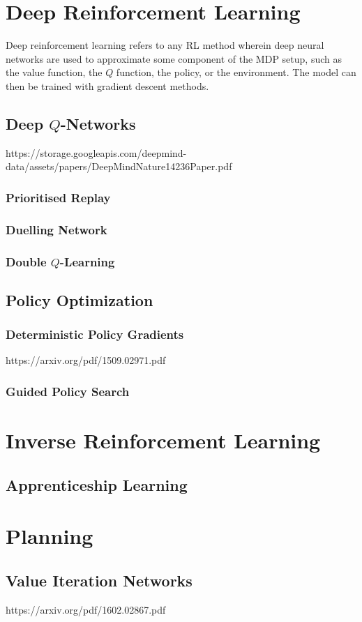 \documentclass{article}
\begin{document}
\section{Deep Reinforcement Learning}
Deep reinforcement learning refers to any RL method wherein deep neural networks are used to approximate some component of the MDP setup, such as the value function, the $ Q $ function, the policy, or the environment. The model can then be trained with gradient descent methods.

\subsection{Deep $ Q $-Networks}
https://storage.googleapis.com/deepmind-data/assets/papers/DeepMindNature14236Paper.pdf

\subsubsection{Prioritised Replay}

\subsubsection{Duelling Network}

\subsubsection{Double $ Q $-Learning}

\subsection{Policy Optimization}

\subsubsection{Deterministic Policy Gradients}
https://arxiv.org/pdf/1509.02971.pdf

\subsubsection{Guided Policy Search}

\section{Inverse Reinforcement Learning}

\subsection{Apprenticeship Learning}

\section{Planning}

\subsection{Value Iteration Networks}
https://arxiv.org/pdf/1602.02867.pdf
\end{document}

